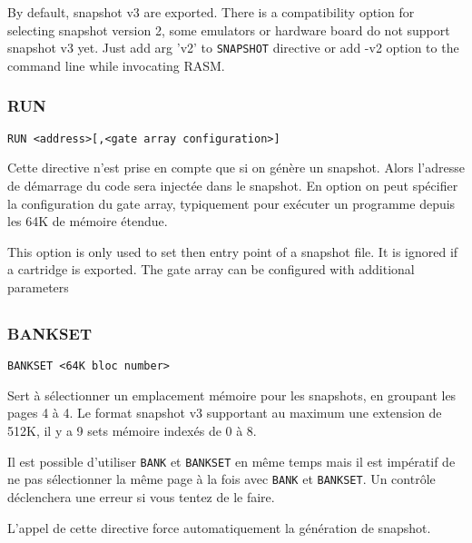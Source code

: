 \begin{xen}
By default, snapshot v3 are exported. There is a compatibility option for selecting snapshot version 2, some emulators or hardware board do not support snapshot v3 yet. Just add arg 'v2' to \texttt{SNAPSHOT} directive or add -v2 option to the command line while invocating RASM.
\end{xen}


\begin{xen}
\end{xen}


\subsubsection{RUN}
\begin{verbatim}
RUN <address>[,<gate array configuration>]
\end{verbatim}

\begin{xfr}
Cette directive n'est prise en compte que si on génère un snapshot. Alors l'adresse de démarrage du code sera injectée dans le snapshot. En option on peut spécifier la configuration du gate array, typiquement pour exécuter un programme depuis les 64K de mémoire étendue.
\end{xfr}

\begin{xen}
This option is only used to set then entry point of a snapshot file. It is ignored if a cartridge is exported. 
The gate array can be configured with additional parameters
\end{xen}

\subsection{}

\subsubsection{BANKSET}
\begin{verbatim}
BANKSET <64K bloc number>
\end{verbatim}

\begin{xfr}
Sert à sélectionner un emplacement mémoire pour les snapshots, en groupant les pages 4 à 4. Le format snapshot v3 supportant au maximum une extension de 512K, il y a 9 sets mémoire indexés de 0 à 8.

Il est possible d'utiliser \texttt{BANK} et \texttt{BANKSET} en même temps mais il est impératif de ne pas sélectionner la même page à la fois avec \texttt{BANK} et \texttt{BANKSET}. Un contrôle déclenchera une erreur si vous tentez de le faire.

L'appel de cette directive force automatiquement la génération de snapshot.
\end{xfr}

